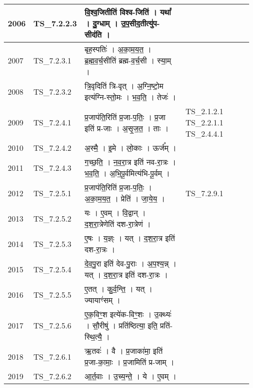 \documentclass[17pt]{extarticle}
\begin{document}
\begin{longtable}{||p{0.4in}||p{0.9in}||p{4.0in}||p{0.9in}||}
        \hline
            2006 & TS\_7.2.2.3 & वि॒श्व॒जितीति॑ विश्व{-}जिति॑   ।   यथा᳚   ।   दु॒ग्धाम्   ।   उ॒प॒सीद॒तीत्यु॑प{-} सीद॑ति   ।    &      \\
        \hline
            2007 & TS\_7.2.3.1 & बृह॒स्पतिः॑   ।   अ॒का॒म॒य॒त॒   ।   ब्र॒ह्म॒व॒र्च॒सीति॑ ब्रह्म{-}व॒र्च॒सी   ।   स्या॒म्   ।    &      \\
        \hline
            2008 & TS\_7.2.3.2 & त्रि॒वृदिति॑ त्रि{-}वृत्   ।   अ॒ग्नि॒ष्टो॒म इत्य॑ग्नि{-}स्तो॒मः   ।   भ॒व॒ति॒   ।   तेजः॑   ।    &      \\
        \hline
            2009 & TS\_7.2.4.1 & प्र॒जाप॑ति॒रिति॑ प्र॒जा{-}प॒तिः॒   ।   प्र॒जा इति॑ प्र{-}जाः   ।   अ॒सृ॒ज॒त॒   ।   ताः   ।    & TS\_2.1.2.1 TS\_2.2.1.1 TS\_2.4.4.1        \\
        \hline
            2010 & TS\_7.2.4.2 & अ॒स्मै॒   ।   इ॒मे   ।   लो॒काः   ।   ऊर्ज᳚म्   ।    &      \\
        \hline
            2011 & TS\_7.2.4.3 & ग॒च्छ॒ति॒   ।   न॒व॒रा॒त्र इति॑ नव{-}रा॒त्रः   ।   भ॒व॒ति॒   ।   अ॒भि॒पू॒र्वमित्य॑भि{-}पू॒र्वम्   ।    &      \\
        \hline
            2012 & TS\_7.2.5.1 & प्र॒जाप॑ति॒रिति॑ प्र॒जा{-}प॒तिः॒   ।   अ॒का॒म॒य॒त॒   ।   प्रेति॑   ।   जा॒ये॒य॒   ।    &  TS\_7.2.9.1       \\
        \hline
            2013 & TS\_7.2.5.2 & यः   ।   ए॒वम्   ।   वि॒द्वान्   ।   द॒श॒रा॒त्रेणेति॑ दश{-}रा॒त्रेण॑   ।    &      \\
        \hline
            2014 & TS\_7.2.5.3 & ए॒षः   ।   य॒ज्ञ्ः   ।   यत्   ।   द॒श॒रा॒त्र इति॑ दश{-}रा॒त्रः   ।    &      \\
        \hline
            2015 & TS\_7.2.5.4 & दे॒व॒पु॒रा इति॑ देव{-}पु॒राः   ।   अ॒प॒श्य॒न्न्   ।   यत्   ।   द॒श॒रा॒त्र इति॑ दश{-}रा॒त्रः   ।    &      \\
        \hline
            2016 & TS\_7.2.5.5 & ए॒तत्   ।   कु॒र्व॒न्ति॒   ।   यत्   ।   ज्यायाꣳ॑सम्   ।    &      \\
        \hline
            2017 & TS\_7.2.5.6 & ए॒क॒विꣳ॒॒श इत्ये॑क{-}विꣳ॒॒शः   ।   उ॒क्थ्यः॑   ।   सौ॒रीषु॑   ।   प्रति॑ष्ठित्या॒ इति॒ प्रति॑{-}स्थि॒त्यै॒   ।    &      \\
        \hline
            2018 & TS\_7.2.6.1 & ऋ॒तवः॑   ।   वै   ।   प्र॒जाका॑मा॒ इति॑ प्र॒जा{-}का॒माः॒   ।   प्र॒जामिति॑ प्र{-}जाम्   ।    &      \\
        \hline
            2019 & TS\_7.2.6.2 & आ॒र्त॒वाः   ।   उ॒च्य॒न्ते॒   ।   ये   ।   ए॒वम्   ।    &      \\

\end{longtable}
\end{document}
